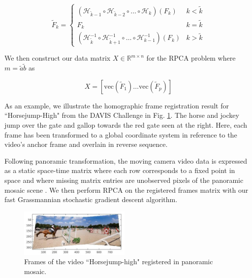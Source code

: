 \documentclass[10pt,twocolumn,letterpaper]{article}
\begin{document}
\begin{equation}
	\tilde{F}_k = \begin{cases} (\mathcal{H}_{\tilde{k}-1} \circ \mathcal{H}_{\tilde{k}-2} \circ \ldots \circ \mathcal{H}_k)(F_k) &k<\tilde{k} \\
	F_k & k=\tilde{k} \\
	(\mathcal{H}_{\tilde{k}}^{-1} \circ \mathcal{H}_{\tilde{k}+1}^{-1} \circ \ldots \circ \mathcal{H}_{k-1}^{-1})(F_k) &k>\tilde{k}
	 \end{cases}
\end{equation}

We then construct our data matrix $X \in \mathbb{R}^{m \times n}$ for the RPCA problem where $m = \tilde{a}\tilde{b}$ as 

\begin{equation}
	X = [\text{vec}(\tilde{F}_1) \ldots \text{vec}(\tilde{F}_p)]
\end{equation}

As an example, we illustrate the homographic frame registration result for ``Horsejump-High" from the DAVIS Challenge \cite{DAVIS} in Fig. \ref{fig:horsejump_registration}. The horse and jockey jump over the gate and gallop towards the red gate seen at the right. Here, each frame has been transformed to a global coordinate system in reference to the video's anchor frame and overlain in reverse sequence.

Following panoramic transformation, the moving camera video data is expressed as a static space-time matrix where each row corresponds to a fixed point in space and where missing matrix entries are unobserved pixels of the panoramic mosaic scene \cite{B.Moore}. We then perform RPCA on the registered frames matrix with our fast Grassmannian stochastic gradient descent algorithm.

\begin{figure}
    \centering
    \includegraphics[width=0.48\textwidth]{pano_img.jpg}
    \caption{Frames of the video ``Horsejump-high" registered in panoramic mosaic.}
    \label{fig:horsejump_registration}
\end{figure}



\end{document}
